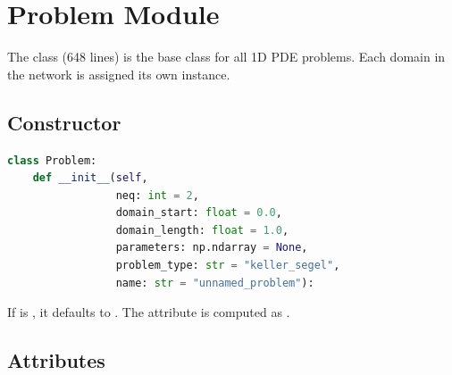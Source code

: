 \section{Problem Module}
\label{sec:problem}

\begin{center}
\end{center}

The  class (648 lines) is the base class for all 1D PDE problems.  Each domain in the network is assigned its own  instance.

\subsection{Constructor}

\begin{lstlisting}[language=Python, caption={Problem constructor}]
class Problem:
    def __init__(self, 
                 neq: int = 2,
                 domain_start: float = 0.0,
                 domain_length: float = 1.0,
                 parameters: np.ndarray = None,
                 problem_type: str = "keller_segel",
                 name: str = "unnamed_problem"):
\end{lstlisting}

If  is , it defaults to .  The attribute  is computed as .

\subsection{Attributes}

